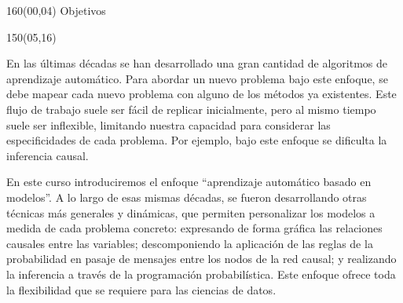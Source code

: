 \documentclass[shownotes,aspectratio=169]{beamer}
\begin{document}
\begin{frame}

\begin{textblock}{160}(00,04)\centering
\textcolor{black!85}{\Large Objetivos}
\end{textblock}

\begin{textblock}{150}(05,16)
\parbox{15cm}{En las últimas décadas se han desarrollado una gran cantidad de algoritmos de aprendizaje automático.
Para abordar un nuevo problema bajo este enfoque, se debe mapear cada nuevo problema con alguno de los métodos ya existentes.
Este flujo de trabajo suele ser fácil de replicar inicialmente, pero al mismo tiempo suele ser inflexible, limitando nuestra capacidad para considerar las especificidades de cada problema. Por ejemplo, bajo este enfoque se dificulta la inferencia causal.

\vspace{0.3cm}

En este curso introduciremos el enfoque ``aprendizaje automático basado en modelos''.
A lo largo de esas mismas décadas, se fueron desarrollando otras técnicas más generales y dinámicas, que permiten personalizar los modelos a medida de cada problema concreto: expresando de forma gráfica las relaciones causales entre las variables; descomponiendo la aplicación de las reglas de la probabilidad en pasaje de mensajes entre los nodos de la red causal; y realizando la inferencia a través de la programación probabilística.
Este enfoque ofrece toda la flexibilidad que se requiere para las ciencias de datos.
}
\end{textblock}
\end{frame}
\end{document}
